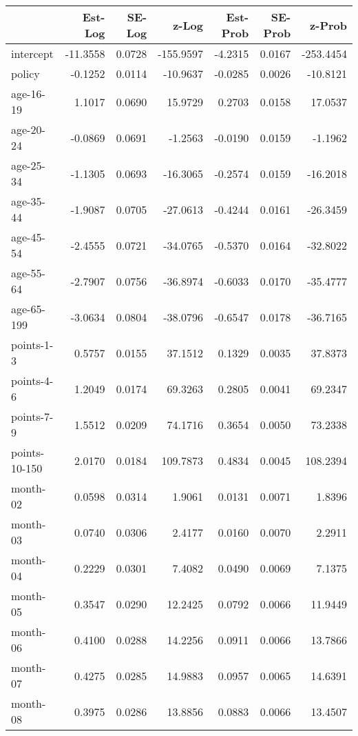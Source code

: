 \documentclass[10pt]{article}
\begin{document}
\begin{table}[ht]
\centering
\begin{tabular}{lrrrrrr}
  \hline
 & Est-Log & SE-Log & z-Log & Est-Prob & SE-Prob & z-Prob \\ 
  \hline
intercept & -11.3558 & 0.0728 & -155.9597 & -4.2315 & 0.0167 & -253.4454 \\ 
  policy & -0.1252 & 0.0114 & -10.9637 & -0.0285 & 0.0026 & -10.8121 \\ 
  age-16-19 & 1.1017 & 0.0690 & 15.9729 & 0.2703 & 0.0158 & 17.0537 \\ 
  age-20-24 & -0.0869 & 0.0691 & -1.2563 & -0.0190 & 0.0159 & -1.1962 \\ 
  age-25-34 & -1.1305 & 0.0693 & -16.3065 & -0.2574 & 0.0159 & -16.2018 \\ 
  age-35-44 & -1.9087 & 0.0705 & -27.0613 & -0.4244 & 0.0161 & -26.3459 \\ 
  age-45-54 & -2.4555 & 0.0721 & -34.0765 & -0.5370 & 0.0164 & -32.8022 \\ 
  age-55-64 & -2.7907 & 0.0756 & -36.8974 & -0.6033 & 0.0170 & -35.4777 \\ 
  age-65-199 & -3.0634 & 0.0804 & -38.0796 & -0.6547 & 0.0178 & -36.7165 \\ 
  points-1-3 & 0.5757 & 0.0155 & 37.1512 & 0.1329 & 0.0035 & 37.8373 \\ 
  points-4-6 & 1.2049 & 0.0174 & 69.3263 & 0.2805 & 0.0041 & 69.2347 \\ 
  points-7-9 & 1.5512 & 0.0209 & 74.1716 & 0.3654 & 0.0050 & 73.2338 \\ 
  points-10-150 & 2.0170 & 0.0184 & 109.7873 & 0.4834 & 0.0045 & 108.2394 \\ 
  month-02 & 0.0598 & 0.0314 & 1.9061 & 0.0131 & 0.0071 & 1.8396 \\ 
  month-03 & 0.0740 & 0.0306 & 2.4177 & 0.0160 & 0.0070 & 2.2911 \\ 
  month-04 & 0.2229 & 0.0301 & 7.4082 & 0.0490 & 0.0069 & 7.1375 \\ 
  month-05 & 0.3547 & 0.0290 & 12.2425 & 0.0792 & 0.0066 & 11.9449 \\ 
  month-06 & 0.4100 & 0.0288 & 14.2256 & 0.0911 & 0.0066 & 13.7866 \\ 
  month-07 & 0.4275 & 0.0285 & 14.9883 & 0.0957 & 0.0065 & 14.6391 \\ 
  month-08 & 0.3975 & 0.0286 & 13.8856 & 0.0883 & 0.0066 & 13.4507 \\ 

\end{tabular}
\end{table}
\end{document}

